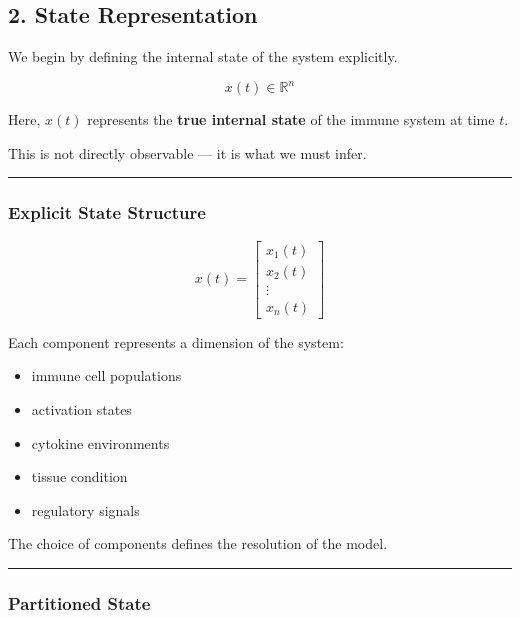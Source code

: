 \documentclass[
  letterpaper,
  DIV=11,
  numbers=noendperiod]{scrartcl}
\providecommand{\tightlist}{%
  \setlength{\itemsep}{0pt}\setlength{\parskip}{0pt}}
\begin{document}
\subsection{2. State Representation}\label{state-representation}

We begin by defining the internal state of the system explicitly.

\[
x(t) \in \mathbb{R}^n
\]

Here, \(x(t)\) represents the \textbf{true internal state} of the immune
system at time \(t\).

This is not directly observable --- it is what we must infer.

\begin{center}\rule{0.5\linewidth}{0.5pt}\end{center}

\subsubsection{Explicit State Structure}\label{explicit-state-structure}

\[
x(t) =
\begin{bmatrix}
x_1(t) \\
x_2(t) \\
\vdots \\
x_n(t)
\end{bmatrix}
\]

Each component represents a dimension of the system:

\begin{itemize}
\tightlist
\item
  immune cell populations\\
\item
  activation states\\
\item
  cytokine environments\\
\item
  tissue condition\\
\item
  regulatory signals
\end{itemize}

The choice of components defines the resolution of the model.

\begin{center}\rule{0.5\linewidth}{0.5pt}\end{center}

\subsubsection{Partitioned State}\label{partitioned-state}
\end{document}
